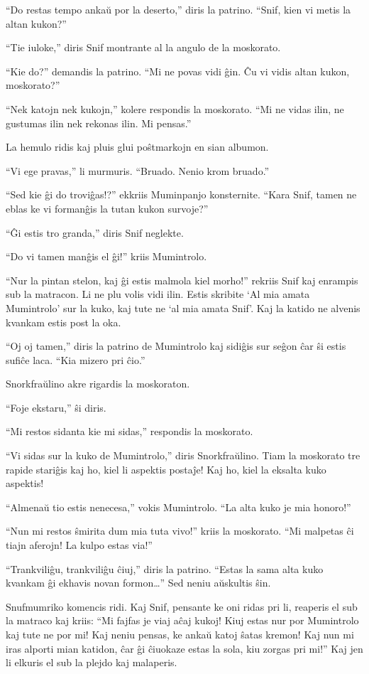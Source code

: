 ``Do restas tempo ankaŭ por la deserto,'' diris la patrino. ``Snif, kien vi metis la altan kukon?''

``Tie iuloke,'' diris Snif montrante al la angulo de la moskorato.

``Kie do?'' demandis la patrino. ``Mi ne povas vidi ĝin. Ĉu vi vidis altan kukon, moskorato?''

``Nek katojn nek kukojn,'' kolere respondis la moskorato. ``Mi ne vidas ilin, ne gustumas ilin nek rekonas ilin. Mi pensas.''

La hemulo ridis kaj pluis glui poŝtmarkojn en sian albumon.

``Vi ege pravas,'' li murmuris. ``Bruado. Nenio krom bruado.''

``Sed kie ĝi do troviĝas!?'' ekkriis Muminpanjo konsternite. ``Kara Snif, tamen ne eblas ke vi formanĝis la tutan kukon survoje?''

``Ĝi estis tro granda,'' diris Snif neglekte.

``Do vi tamen manĝis el ĝi!'' kriis Mumintrolo.

``Nur la pintan stelon, kaj ĝi estis malmola kiel morho!'' rekriis Snif kaj enrampis sub la matracon. Li ne plu volis vidi ilin. Estis skribite `Al mia amata Mumintrolo' sur la kuko, kaj tute ne `al mia amata Snif'. Kaj la katido ne alvenis kvankam estis post la oka.

``Oj oj tamen,'' diris la patrino de Mumintrolo kaj sidiĝis sur seĝon ĉar ŝi estis sufiĉe laca. ``Kia mizero pri ĉio.''

Snorkfraŭlino akre rigardis la moskoraton.

``Foje ekstaru,'' ŝi diris.

``Mi restos sidanta kie mi sidas,'' respondis la moskorato.

``Vi sidas sur la kuko de Mumintrolo,'' diris Snorkfraŭlino. Tiam la moskorato tre rapide stariĝis kaj ho, kiel li aspektis postaĵe! Kaj ho, kiel la eksalta kuko aspektis!

``Almenaŭ tio estis nenecesa,'' vokis Mumintrolo. ``La alta kuko je mia honoro!''

``Nun mi restos ŝmirita dum mia tuta vivo!'' kriis la moskorato. ``Mi malpetas ĉi tiajn aferojn! La kulpo estas via!''

``Trankviliĝu, trankviliĝu ĉiuj,'' diris la patrino. ``Estas la sama alta kuko kvankam ĝi ekhavis novan formon{\ldots}'' Sed neniu aŭskultis ŝin.

Snufmumriko komencis ridi. Kaj Snif, pensante ke oni ridas pri li, reaperis el sub la matraco kaj kriis: ``Mi fajfas je viaj aĉaj kukoj! Kiuj estas nur por Mumintrolo kaj tute ne por mi! Kaj neniu pensas, ke ankaŭ katoj ŝatas kremon! Kaj nun mi iras alporti mian katidon, ĉar ĝi ĉiuokaze estas la sola, kiu zorgas pri mi!'' Kaj jen li elkuris el sub la plejdo kaj malaperis.

